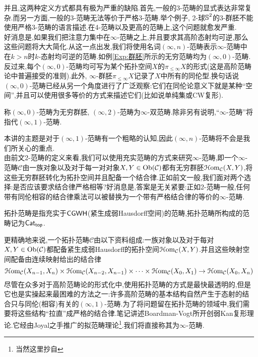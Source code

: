 并且,这两种定义方式都具有极为严重的缺陷.首先,一般的3-范畴的显式表达非常复杂.而另一方面,一般的3-范畴无法等价于严格3-范畴.举个例子, 2-球$\operatorname{\mathbb{S}}^2$的3-群胚不能使用严格3-范畴的语言描述.在4-范畴以及更高的范畴上,这个问题就愈发严重.\\

好消息是,如果我们把注意力集中在$\infty$-范畴之上,并且要求其高阶态射均可逆,那么这些问题将大大简化.从这一点出发,我们将使用名词$(\infty,n)$-范畴表示$\infty$-范畴中在$k>n$时$k$-态射均可逆的范畴.如例\ref{Exp:群胚}所示的无穷范畴均为$(\infty,0)$-范畴.反过来,每个$(\infty,0)$-范畴均可写为某个拓扑空间$X$的$\pi_{\leq \infty}X$的形式(这是高阶范畴论中普遍接受的准则).此外, $\infty$-群胚$\pi_{\leq \infty} X$记录了$X$中所有的同伦型.换句话说$(\infty,0)$-范畴已经从另一个角度进行了广泛观察:它们在同伦论意义下就是某种``空间'',并且可以使用很多等价的方式来描述它们(比如说单纯集或CW复形).
\begin{notation}
    称$(\infty,0)$-范畴为无穷群胚, $(\infty,2)$-范畴为$\infty$-双范畴.除非另有说明,``$\infty$-范畴''将指代$(\infty,1)$-范畴.
\end{notation}
本讲的主题是对于$(\infty,1)$-范畴有一个粗略的认知,因此$(\infty,n)$-范畴将不会是我们所关心的重点.\\

由前文2-范畴的定义来看,我们可以使用充实范畴的方式来研究$\infty$-范畴,即一个$\infty$-范畴$\mathcal{C}$由一族对象以及对于每一对对象$X,Y\in \operatorname{Ob}(\mathcal{C})$都有无穷群胚$\EuScript{H}\mathrm{om}_{\mathcal{C}}(X,Y)$,将这些无穷群胚转化为拓扑空间并且配备一个结合律.正如前文一般,我们面对两个选择:是否应该要求结合律严格相等?好消息是,答案是无关紧要:正如2-范畴一般,任何带有同伦相容的结合律乘法可以被替换为一个带有严格结合律的等价的$\infty$-范畴.
\begin{definition}
    拓扑范畴是指充实于$\mathsf{CGWH}$(紧生成弱Hausdorff空间)的范畴,拓扑范畴所构成的范畴记为$\mathsf{Cat}_{\mathsf{top}}$.
\end{definition}
更精确地来说,一个拓扑范畴$\mathcal{C}$由以下资料组成:一族对象以及对于每对$X,Y\in \operatorname{Ob}(\mathcal{C})$都配备紧生成弱Hausdorff的拓扑空间$\EuScript{H}\mathrm{om}_{\mathcal{C}}(X,Y)$.并且这些映射空间配备由连续映射给出的结合律
\[
\EuScript{H}\mathrm{om}_{\mathcal{C}}(X_{n-1},X_n)\times \EuScript{H}\mathrm{om}_{\mathcal{C}}(X_{n-2},X_{n-1})\times \cdots \times \EuScript{H}\mathrm{om}_{\mathcal{C}}(X_0,X_1) \to \EuScript{H}\mathrm{om}_{\mathcal{C}}(X_0,X_n)
\]
尽管在众多对于高阶范畴论的形式化中,使用拓扑范畴的方式是最快最透明的,但是它也是实操起来最困难的方法之一:许多高阶范畴的基本结构自然产生于态射的结合只与同伦(相容)有关的$(\infty,1)$-范畴.为了将问题留在拓扑范畴的领域中,我们需要将这些结构``拉直''成严格的结合律.笔记讲述Boardman-Vogt\cite{BV2006}所开创弱Kan复形理论.它经由Joyal之手推广\cite{joyal2008notes}的拟范畴理论\footnote{当然这里抄自\cite{HTT}}.我们将直接称其为$\infty$-范畴.